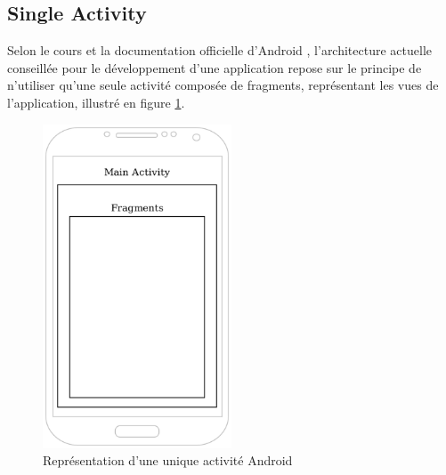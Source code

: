 \subsection{Single Activity}
Selon le cours et la documentation officielle d'Android \cite{docandroid}, l'architecture actuelle conseillée pour le développement d'une application repose sur le principe de n'utiliser qu'une seule activité composée de fragments, représentant les vues de l'application, illustré en figure \ref{single_activity}.
\begin{figure}
    \begin{center}
        \includegraphics[width=0.5\textwidth]{img/schemas/Single_Activity.png}
    \end{center}
    \caption{Représentation d'une unique activité Android}
    \label{single_activity}
\end{figure}

